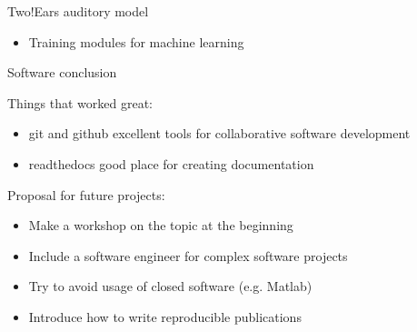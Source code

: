 \documentclass{beamer}
\begin{document}
\begin{frame}{Two!Ears auditory model}
\begin{minipage}[b]{0.56\columnwidth}
        \begin{itemize}
            \item Training modules for machine learning
        \end{itemize}

    \end{minipage}

\end{frame}

\begin{frame}{Software conclusion}

    Things that worked great:
    \begin{itemize}
        \item git and github excellent tools for collaborative software development
        \item readthedocs good place for creating documentation
    \end{itemize}

    \vspace{0.6cm}

    Proposal for future projects:
    \begin{itemize}
        \item Make a workshop on the topic at the beginning
        \item Include a software engineer for complex software projects
        \item Try to avoid usage of closed software (e.g. Matlab)
        \item Introduce how to write reproducible publications
    \end{itemize}

\end{frame}
\end{document}
